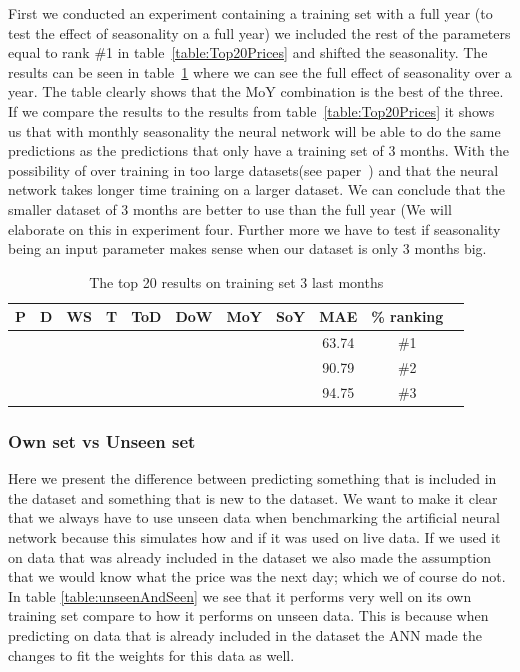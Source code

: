 First we conducted an experiment containing a training set with a full year (to test the effect of seasonality on a full year) we included the rest of the parameters equal to rank \#1 in table~\ref{table:Top20Prices} and shifted the seasonality. The results can be seen in table~\ref{table:1YearTrain} where we can see the full effect of seasonality over a year. The table clearly shows that the MoY combination is the best of the three. If we compare the results to the results from table~\ref{table:Top20Prices} it shows us that with monthly seasonality the neural network will be able to do the same predictions as the predictions that only have a training set of 3 months. With the possibility of over training in too large datasets(see paper~\cite{1}) and that the neural network takes longer time training on a larger dataset. We can conclude that the smaller dataset of 3 months are better to use than the full year (We will elaborate on this in experiment four. Further more we have to test if seasonality being an input parameter makes sense when our dataset is only 3 months big.

\begin{table}[H]
\centering  %
\begin{tabular}{|c|c|c|c|c|c|c|c|c|c|c|} %
\hline
P & D & WS & T & ToD & DoW & MoY & SoY & MAE & \% ranking\\ [0.5ex] %
\hline
\x    & \x    & \x    & \x    & \x\m  & \x\m  & \x\m  &       & 63.74 & \#1 \\ \hline
\x    & \x    & \x    & \x    & \x\m  & \x\m  &       &       & 90.79 & \#2 \\ \hline
\x    & \x    & \x    & \x    & \x\m  & \x\m  &       & \x\m  & 94.75 & \#3 \\ \hline
\end{tabular}
\caption{The top 20 results on training set 3 last months} %
\label{table:1YearTrain} %
\end{table}

\subsubsection{Own set vs Unseen set}
Here we present the difference between predicting something that is included in the dataset and something that is new to the dataset. We want to make it clear that we always have to use unseen data when benchmarking the artificial neural network because this simulates how and if it was used on live data. If we used it on data that was already included in the dataset we also made the assumption that we would know what the price was the next day; which we of course do not. In table \ref{table:unseenAndSeen} we see that it performs very well on its own training set compare to how it performs on unseen data. This is because when predicting on data that is already included in the dataset the ANN made the changes to fit the weights for this data as well.

